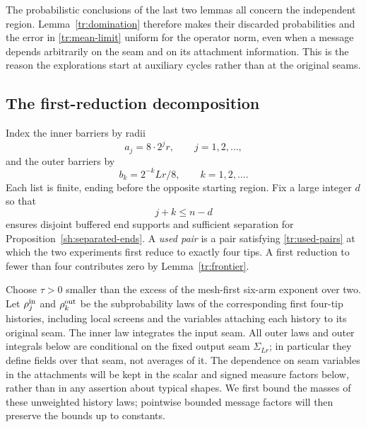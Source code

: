 

The probabilistic conclusions of the last two lemmas all concern the
independent region.  Lemma~\ref{tr:domination} therefore makes their
discarded probabilities and the error in \eqref{tr:mean-limit} uniform
for the operator norm, even when a message depends arbitrarily on the
seam and on its attachment information.  This is the reason the
explorations start at auxiliary cycles rather than at the original
seams.

\subsection{The first-reduction decomposition}

Index the inner barriers by radii
\[
             a_j=8\cdot2^j r,
\qquad j=1,2,\ldots,
\]
and the outer barriers by
\[
             b_k=2^{-k}Lr/8,
\qquad k=1,2,\ldots.
\]
Each list is finite, ending before the opposite starting region.  Fix
a large integer $d$ so that
\begin{equation}
                  j+k\le n-d
\label{tr:used-pairs}
\end{equation}
ensures disjoint buffered end supports and sufficient separation for
Proposition~\ref{sh:separated-ends}.  A \emph{used pair} is a pair
satisfying \eqref{tr:used-pairs} at which the two experiments first
reduce to exactly four tips.  A first reduction to fewer than four
contributes zero by Lemma~\ref{tr:frontier}.

Choose $\tau>0$ smaller than the excess of the mesh-first six-arm
exponent over two.  Let $\rho_j^{\rm in}$ and $\rho_k^{\rm out}$ be the
subprobability laws of the corresponding first four-tip histories,
including local screens and the variables attaching each history to its
original seam.  The inner law integrates the input seam.  All outer
laws and outer integrals below are conditional on the fixed output seam
$\Sigma_{Lr}$; in particular they define fields over that seam, not
averages of it.  The dependence on seam variables in the
attachments will be kept in the scalar and signed measure factors
below, rather than in any assertion about typical shapes.  We first
bound the masses of these unweighted history laws; pointwise bounded
message factors will then preserve the bounds up to constants.

